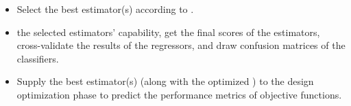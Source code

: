 \begin{itemize}
    	\item Select the best estimator(s) according to \DIFdelbegin {}\DIFdelend \DIFaddbegin {}\DIFaddend .
    	\item \DIFdelbegin {}\DIFdelend \DIFaddbegin {}\DIFaddend the selected estimators' capability, get the final scores of the estimators, cross-validate the results of the	regressors, and draw confusion matrices of the classifiers.
    	\item Supply the best estimator(s) (along with the optimized \DIFdelbegin {}\DIFdelend \DIFaddbegin {}\DIFaddend ) to the design optimization phase to predict the performance	metrics of \DIFdelbegin {}\DIFdelend objective functions.
    \end{itemize}

